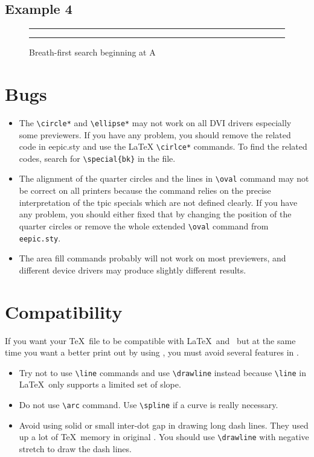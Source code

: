 \subsection{Example 4}
\begin{figure}[htbp]
\hrule
\begin{center}

\end{center}
\caption{Breath-first search beginning at A}
\medskip
\hrule
\end{figure}


\clearpage


\section{Bugs}
\begin{itemize}
\item The \verb|\circle*| and \verb|\ellipse*| may not work on
all DVI drivers especially some previewers. If you have any
problem, you should remove the related code in eepic.sty and use
the \LaTeX{} \verb|\cirlce*| commands. To find the related codes,
search for \verb|\special{bk}| in the file.
\item The alignment of the quarter circles and the lines in
\verb|\oval| command may not be correct on all printers because
the command relies on the precise interpretation of the tpic
specials which are not defined clearly. If you have any problem,
you should either fixed that by changing the position of the
quarter circles or remove the whole extended \verb|\oval| command
from \verb|eepic.sty|.
\item The area fill commands probably will not work on most
previewers, and different device drivers may produce slightly
different results.
\end{itemize}


\section{Compatibility}\label{compat}
If you want your \TeX\ file to be compatible with \LaTeX\ and
\epic\ but at the same time you want a better print out by using
\eepic, you must avoid several features in \eepic.
\begin{itemize}
\item Try not to use \verb|\line| commands and use
\verb|\drawline| instead because \verb|\line| in \LaTeX\ only
supports a limited set of slope.
\item Do not use \verb|\arc| command. Use \verb|\spline| if a
curve is really necessary.
\item Avoid using solid or small inter-dot gap in drawing long
dash lines. They used up a lot of \TeX\ memory in original \epic.
You should use \verb|\drawline| with negative stretch to draw the
dash lines.
\end{itemize}

